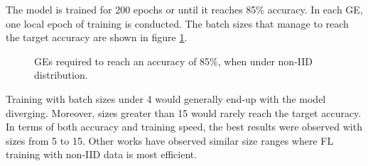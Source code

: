 The model is trained for 200 epochs or until it reaches 85\% accuracy. In each GE, one local epoch of training is conducted. The batch sizes that manage to reach the target accuracy are shown in figure \ref{fig: nonIID, GEs per batch size}. %
\begin{figure}[H]
    \center
    \caption[ non-IID distribution, GEs per batch size ]{ GEs required to reach an accuracy of 85\%, when under non-IID distribution.}
    \label{fig: nonIID, GEs per batch size}
\end{figure}

Training with batch sizes under 4 would generally end-up with the model diverging. Moreover, sizes greater than 15 would rarely reach the target accuracy. In terms of both accuracy and training speed, the best results were observed with sizes from 5 to 15. Other works have observed similar size ranges where FL training with non-IID data is most efficient. %

